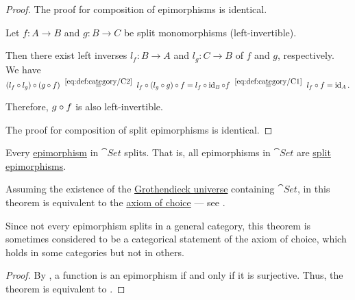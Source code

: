 \begin{proof}
  The proof for composition of epimorphisms is identical.

   Let \( f: A \to B \) and \( g: B \to C \) be split monomorphisms (left-invertible).

  Then there exist left inverses \( l_f: B \to A \) and \( l_g: C \to B \) of \( f \) and \( g \), respectively. We have
  \begin{equation*}
    (l_f \bincirc l_g) \bincirc (g \bincirc f)
    \reloset {\eqref{eq:def:category/C2}} =
    l_f \bincirc (l_g \bincirc g) \bincirc f
    =
    l_f \bincirc \id_B \bincirc f
    \reloset {\eqref{eq:def:category/C1}} =
    l_f \bincirc f
    =
    \id_A.
  \end{equation*}

  Therefore, \( g \bincirc f \) is also left-invertible.

  The proof for composition of split epimorphisms is identical.
\end{proof}

\begin{theorem}\label{thm:epimorphisms_split_in_set}
  Every \hyperref[def:morphism_invertibility/right_cancellative]{epimorphism} in \hyperref[def:category_of_small_sets]{\( \cat{Set} \)} splits. That is, all epimorphisms in \( \cat{Set} \) are \hyperref[def:morphism_invertibility/right_invertible]{split epimorphisms}.
\end{theorem}
\begin{comments}
  \item Assuming the existence of the \hyperref[def:grothendieck_universe]{Grothendieck universe} containing \( \cat{Set} \), in \hyperref[def:zfc]{} this theorem is equivalent to the \hyperref[def:zfc/choice]{axiom of choice} --- see .

  \item Since not every epimorphism splits in a general category, this theorem is sometimes considered to be a categorical statement of the axiom of choice, which holds in some categories but not in others.
\end{comments}
\begin{proof}
  By , a function is an epimorphism if and only if it is surjective. Thus, the theorem is equivalent to .
\end{proof}

